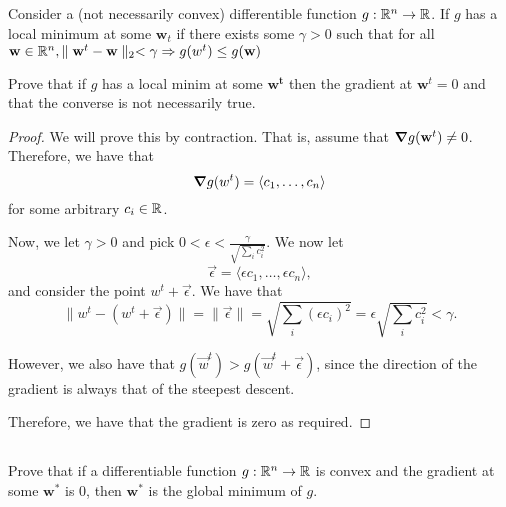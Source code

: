 \documentclass[twoside]{article}
\begin{document}
\newpage
\subsection{}
Consider a (not necessarily convex) differentible function $g: \mathbb{R}^{n} \to \mathbb{R}$. If $g$ has a local minimum at some $\mathbf{w}_{t}$ 
if there exists some $\gamma > 0$ such that for all 
$\mathbf{w} \in \mathbb{R}^{n}, \parallel \mathbf{w}^{t} - \mathbf{w} \parallel_{2} < \gamma \Rightarrow g(w^{t}) \leq g(\mathbf{w})$

Prove that if $g$ has a local minim at some $\mathbf{w^{t}}$ then the gradient at $\mathbf{w}^{t} = 0$ and that the converse is not 
necessarily true.

\begin{proof}
    We will prove this by contraction. That is, assume that $\grad g(\mathbf{w}^{t}) \neq 0$.
    Therefore, we have that
    \begin{equation*}
        \grad g(w^{t}) = \langle c_{1}, \dots, c_{n} \rangle
    \end{equation*}
    for some arbitrary $c_{i} \in \mathbb{R}$.

    Now, we let $\gamma > 0$ and pick $0 < \epsilon < \frac{\gamma}{\sqrt{\sum_{i}c_{i}^{2}}}$. We now let 
    \begin{equation*}
        \vec{\epsilon} = \langle \epsilon c_{1}, \dots, \epsilon c_{n} \rangle,
    \end{equation*}
    and consider the point $w^{t} + \vec{\epsilon}$. We have that 
    \begin{equation*}
        \lVert w^{t} - (w^{t} + \vec{\epsilon}) \rVert = \lVert \vec{\epsilon} \rVert = \sqrt{\sum_{i} (\epsilon c_{i})^{2}}
        = \epsilon \sqrt{\sum_{i} c_{i}^{2}} < \gamma.
    \end{equation*}

    However, we also have that $g(\vec{w}^{t}) > g(\vec{w}^{t} + \vec{\epsilon})$, since the direction of the gradient
    is always that of the steepest descent. \contra

    Therefore, we have that the gradient is zero as required.
\end{proof}

\newpage
\subsection{}
Prove that if a differentiable function $g: \mathbb{R}^{n} \to \mathbb{R}$ is convex and the gradient at some $\mathbf{w}^{*}$ is 0, then 
$\mathbf{w}^{*}$ is the global minimum of $g$.
\end{document}
